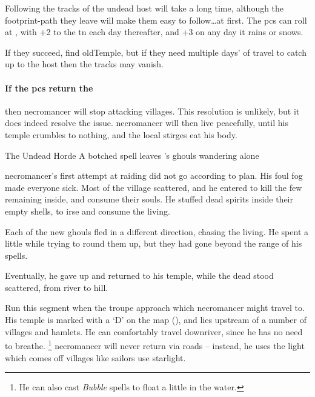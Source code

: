 Following the tracks of the undead host will take a long time, although the footprint-path they leave will make them easy to follow\ldots at first.
The \glspl{pc} can roll  at \tn[5], with +2 to the \gls{tn} each day thereafter, and +3 on any day it rains or snows.

If they succeed, find \gls{oldTemple}, but if they need multiple days' of travel to catch up to the host then the tracks may vanish.

\paragraph{If the \glspl{pc} return the }
then \gls{necromancer} will stop attacking \glspl{village}.
This resolution is unlikely, but it does indeed resolve the issue.
\Gls{necromancer} will then live peacefully, until his temple crumbles to nothing, and the local stirges eat his body.

{The Undead Horde}%
{A botched spell leaves 's ghouls wandering alone}%
\label{necroHorde}

\begin{exampletext}
  \Gls{necromancer}'s first attempt at raiding  did not go according to plan.
  His foul fog made everyone sick.
  Most of the \gls{village} scattered, and he entered to kill the few remaining inside, and consume their souls.
  He stuffed dead spirits inside their empty shells, to irse and consume the living.

  Each of the new ghouls fled in a different direction, chasing the living.
  He spent a little while trying to round them up, but they had gone beyond the range of his spells.

  Eventually, he gave up and returned to his temple, while the dead stood scattered, from river to hill.
\end{exampletext}

Run this \gls{segment} when the troupe approach  which \gls{necromancer} might travel to.
His temple is marked with a `\gls{D}' on the map (), and lies upstream of a number of \glspl{village} and hamlets.
He can comfortably travel downriver, since he has no need to breathe.%
\footnote{He can also cast \textit{Bubble} spells to float a little in the water.}
\Gls{necromancer} will never return via roads -- instead, he uses the light which comes off \glspl{village} like sailors use starlight.

